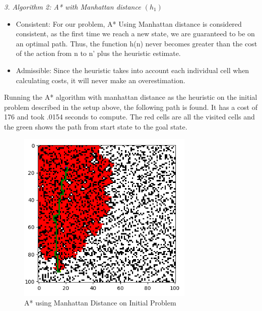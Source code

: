 \documentclass[a4paper]{article}
\begin{document}
\newpage

\textit{3. Algorithm 2: A* with Manhattan distance $(h_1)$}
\begin{itemize}
    \item Consistent: For our problem, A* Using Manhattan distance is considered consistent, as the first time we reach a new state, we are guaranteed to be on an optimal path. Thus, the function h(n) never becomes greater than the cost of the action from n to n’ plus the heuristic estimate.
    \item Admissible: Since the heuristic takes into account each individual cell when calculating costs, it will never make an overestimation.
\end{itemize}
Running the A* algorithm with manhattan distance as the heuristic on the initial problem described in the setup above, the following path is found. It has a cost of 176 and took .0154 seconds to compute. The red cells are all the visited cells and the green shows the path from start state to the goal state.

\begin{figure}[ht]
    \centering
    \includegraphics[width=0.75\textwidth]{fig4.png}
    \caption{A* using Manhattan Distance on Initial Problem}
    \label{fig:h1}
\end{figure}

\newpage
\end{document}
